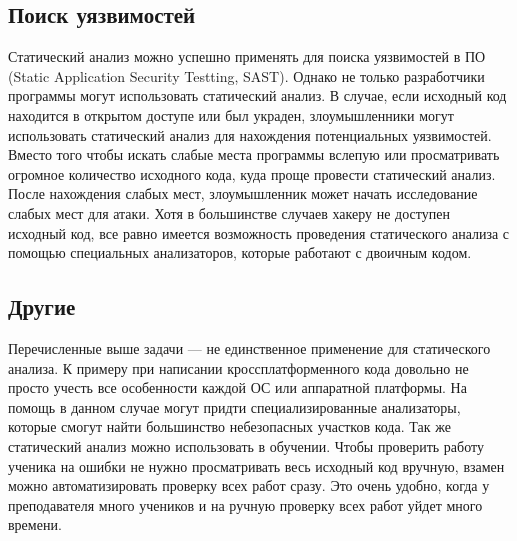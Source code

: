 \subsection {Поиск уязвимостей}
Статический анализ можно успешно применять для поиска уязвимостей в ПО (Static Application Security Testting, SAST).
Однако не только разработчики программы могут использовать статический анализ. В случае, если
исходный код находится в открытом доступе или был украден, злоумышленники могут использовать 
статический анализ для нахождения потенциальных уязвимостей. Вместо того чтобы искать слабые
места программы вслепую или просматривать огромное количество исходного кода, куда проще провести статический анализ.
После нахождения слабых мест, злоумышленник может начать исследование слабых мест для атаки.
Хотя в большинстве случаев хакеру не доступен исходный код, все равно имеется возможность проведения 
статического анализа с помощью специальных анализаторов, которые работают с двоичным кодом.

\subsection {Другие}
Перечисленные выше задачи --- не единственное применение для статического анализа. К примеру 
при написании кроссплатформенного кода довольно не просто учесть все особенности каждой ОС
или аппаратной платформы. На помощь в данном случае могут придти специализированные анализаторы,
которые смогут найти большинство небезопасных участков кода. 
Так же статический анализ можно использовать в обучении. Чтобы проверить работу ученика на ошибки
не нужно просматривать весь исходный код вручную, взамен можно автоматизировать проверку всех работ сразу.
Это очень удобно, когда у преподавателя много учеников и на ручную проверку всех работ уйдет
много времени. 

